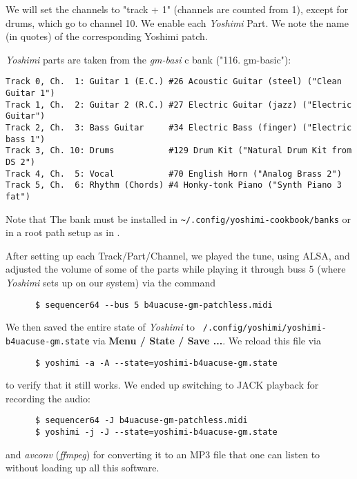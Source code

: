   We will set the channels to "track + 1" (channels are counted from 1),
   except for drums, which go to channel 10.  We enable each
   \textsl{Yoshimi} Part.  We
   note the name (in quotes) of the corresponding Yoshimi patch.

   \textsl{Yoshimi} parts are taken from the \textsl{gm-basi}
   c bank ("116. gm-basic"):

\begin{verbatim}
Track 0, Ch.  1: Guitar 1 (E.C.) #26 Acoustic Guitar (steel) ("Clean Guitar 1")
Track 1, Ch.  2: Guitar 2 (R.C.) #27 Electric Guitar (jazz) ("Electric Guitar")
Track 2, Ch.  3: Bass Guitar     #34 Electric Bass (finger) ("Electric bass 1")
Track 3, Ch. 10: Drums           #129 Drum Kit ("Natural Drum Kit from DS 2")
Track 4, Ch.  5: Vocal           #70 English Horn ("Analog Brass 2")
Track 5, Ch.  6: Rhythm (Chords) #4 Honky-tonk Piano ("Synth Piano 3 fat")
\end{verbatim}

   Note that The bank must be installed in
   \texttt{\textasciitilde/.config/yoshimi-cookbook/banks} or
   in a root path setup as in
   .

   After setting up each Track/Part/Channel, we played the tune, using
   ALSA, and adjusted
   the volume of some of the parts while playing it through buss 5 (where
   \textsl{Yoshimi} sets up on our system) via the command

   \begin{verbatim}
      $ sequencer64 --bus 5 b4uacuse-gm-patchless.midi
   \end{verbatim}
   
   We then saved the entire state of \textsl{Yoshimi} to
   \texttt{~/.config/yoshimi/yoshimi-b4uacuse-gm.state}
   via \textbf{Menu / State / Save ...}.  We reload this file via

   \begin{verbatim}
      $ yoshimi -a -A --state=yoshimi-b4uacuse-gm.state
   \end{verbatim}
   
to verify that it still works.  We ended up switching to JACK playback for
recording the audio:

   \begin{verbatim}
      $ sequencer64 -J b4uacuse-gm-patchless.midi
      $ yoshimi -j -J --state=yoshimi-b4uacuse-gm.state
   \end{verbatim}

   and \textsl{avconv} (\textsl{ffmpeg}) for converting it to an MP3 file that
   one can listen to without loading up all this software.

